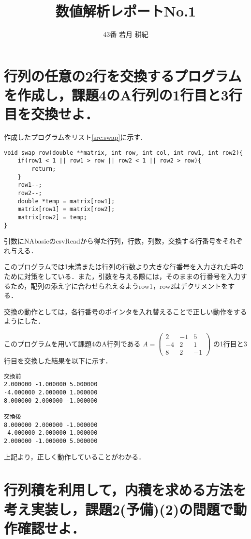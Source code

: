 \documentclass[dvipdfmx,titlepage]{jsarticle}
\title{\Huge{数値解析レポートNo.1}}
\author{\huge{43番 若月 耕紀}}
\date{}
\begin{document}
\maketitle
\newpage

\section{行列の任意の2行を交換するプログラムを作成し，課題4のA行列の1行目と3行目を交換せよ．}

作成したプログラムをリスト\ref{src:swap}に示す.

\begin{lstlisting}[caption=swap\_row.c, label=src:swap]
void swap_row(double **matrix, int row, int col, int row1, int row2){
    if(row1 < 1 || row1 > row || row2 < 1 || row2 > row){
        return;
    }
    row1--;
    row2--;
    double *temp = matrix[row1];
    matrix[row1] = matrix[row2];
    matrix[row2] = temp;
}
\end{lstlisting}

引数にNAbasicのcsvReadから得た行列，行数，列数，交換する行番号をそれぞれ与える．

このプログラムでは1未満または行列の行数より大きな行番号を入力された時のために対策をしている．また，引数を与える際には，そのままの行番号を入力するため，配列の添え字に合わせられえるようrow1，row2はデクリメントをする．

交換の動作としては，各行番号のポインタを入れ替えることで正しい動作をするようにした．

このプログラムを用いて課題4のA行列である
$
            A = \left(
                \begin{array}{ccc}
                  2 & -1 & 5 \\
                  -4 & 2 & 1 \\
                  8 & 2 & -1
                \end{array}
            \right)
        $
の1行目と3行目を交換した結果を以下に示す．
\begin{verbatim}
交換前
2.000000 -1.000000 5.000000 
-4.000000 2.000000 1.000000 
8.000000 2.000000 -1.000000 

交換後
8.000000 2.000000 -1.000000 
-4.000000 2.000000 1.000000 
2.000000 -1.000000 5.000000 
        \end{verbatim}

上記より，正しく動作していることがわかる．

\section{行列積を利用して，内積を求める方法を考え実装し，課題2(予備)(2)の問題で動作確認せよ．}
\end{document}
